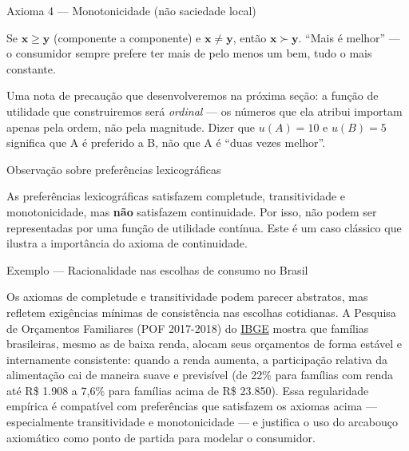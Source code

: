\documentclass[11pt,twoside,openright]{book}
\begin{document}
\begin{definitionbox}{Axioma 4 — Monotonicidade (não saciedade local)}

Se \(\mathbf{x} \geq \mathbf{y}\) (componente a componente) e
\(\mathbf{x} \neq \mathbf{y}\), então \(\mathbf{x} \succ \mathbf{y}\).
``Mais é melhor'' --- o consumidor sempre prefere ter mais de pelo menos
um bem, tudo o mais constante.

\end{definitionbox}

Uma nota de precaução que desenvolveremos na próxima seção: a função de
utilidade que construiremos será \emph{ordinal} --- os números que ela
atribui importam apenas pela ordem, não pela magnitude. Dizer que
\(u(A) = 10\) e \(u(B) = 5\) significa que A é preferido a B, não que A
é ``duas vezes melhor''.

\begin{tipbox}{Observação sobre preferências lexicográficas}

As preferências lexicográficas satisfazem completude, transitividade e
monotonicidade, mas \textbf{não} satisfazem continuidade. Por isso, não
podem ser representadas por uma função de utilidade contínua. Este é um
caso clássico que ilustra a importância do axioma de continuidade.

\end{tipbox}

\begin{infobox}{Exemplo — Racionalidade nas escolhas de consumo no Brasil}

Os axiomas de completude e transitividade podem parecer abstratos, mas
refletem exigências mínimas de consistência nas escolhas cotidianas. A
Pesquisa de Orçamentos Familiares (POF 2017-2018) do
\href{https://www.ibge.gov.br}{IBGE} mostra que famílias brasileiras,
mesmo as de baixa renda, alocam seus orçamentos de forma estável e
internamente consistente: quando a renda aumenta, a participação
relativa da alimentação cai de maneira suave e previsível (de 22\% para
famílias com renda até R\$ 1.908 a 7,6\% para famílias acima de R\$
23.850). Essa regularidade empírica é compatível com preferências que
satisfazem os axiomas acima --- especialmente transitividade e
monotonicidade --- e justifica o uso do arcabouço axiomático como ponto
de partida para modelar o consumidor.

\end{infobox}
\end{document}
